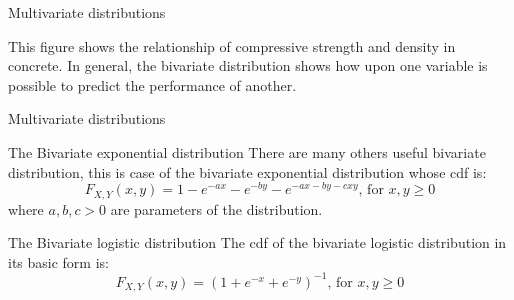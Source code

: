 \documentclass[8pt]{beamer}
\renewcommand{\emph}[1]{\textcolor{myorange}{#1}}
\begin{document}
\begin{frame}{Multivariate distributions}
\begin{minipage}{0.37\textwidth}
\end{minipage}
\hfill
\begin{minipage}{0.59\textwidth}
    This figure shows the relationship of compressive strength and density in concrete. In general, the bivariate distribution shows how upon one variable is possible to predict the performance of another. 
\end{minipage}

\end{frame}

\begin{frame}{Multivariate distributions} 
    \begin{block}{The \alert{Bivariate exponential} distribution}
        There are many others useful bivariate distribution, this is case of the \alert{bivariate exponential distribution} whose \emph{cdf} is:
        \[
            F_{X,Y} (x,y) = 1-e^{-ax} - e^{-by} - e^{-ax - by - cxy}, \, \text{for } x,y \geq 0 
        \]
        where $a,b,c > 0$ are parameters of the distribution. 
   \end{block}
 \begin{block}{The \alert{Bivariate logistic} distribution}
     The \emph{cdf} of the \alert{bivariate logistic distribution} in its basic form is:
        \[
            F_{X,Y} (x,y) = \left( 1 + e^{-x} + e^{-y} \right)^{-1}, \, \text{for } x,y \geq 0
        \]
   \end{block}

        \end{frame}
\end{document}
